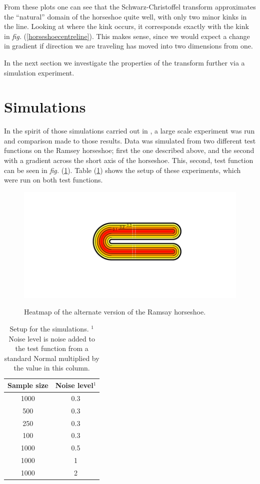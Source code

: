 \documentclass[a4paper,10pt]{amsart}
\newcommand{\sch}{Schwarz-Christoffel }
\newcommand{\fig}[1]{\emph{fig.} (\ref{#1})}
\begin{document}
From these plots one can see that the \sch transform approximates the ``natural'' domain of the horseshoe quite well, with only two minor kinks in the line. Looking at where the kink occurs, it corresponds exactly with the kink in \fig{horseshoecentreline}. This makes sense, since we would expect a change in gradient if direction we are traveling has moved into two dimensions from one.

In the next section we investigate the properties of the transform further via a simulation experiment.

\section{Simulations}

In the spirit of those simulations carried out in \cite{soap}, a large scale experiment was run and comparison made to those results. Data was simulated from two different test functions on the Ramsey horseshoe; first the one described above, and the second with a gradient across the short axis of the horseshoe. This, second, test function can be seen in \fig{altramsayhorseshoe}. Table (\ref{simtable}) shows the setup of these experiments, which were run on both test functions.

\begin{figure}
\centering
\includegraphics[trim=0.5in 1in 0in 0.5in]{figs/altramsayhorseshoe.pdf} \\
\caption{Heatmap of the alternate version of the Ramsay horseshoe.}
\label{altramsayhorseshoe}
\end{figure}

\begin{table}[ht]
\begin{tabular}{c c}\\
Sample size & Noise level$^{1}$ \\
\hline
\hline
1000 & 0.3 \\
500 & 0.3 \\
250 & 0.3 \\
100 & 0.3 \\
1000 & 0.5 \\
1000 & 1 \\
1000 & 2 \\
\end{tabular}
\caption{Setup for the simulations. $^{1}$Noise level is noise added to the test function from a standard Normal multiplied by the value in this column.}
\label{simtable}
\end{table}
\end{document}
